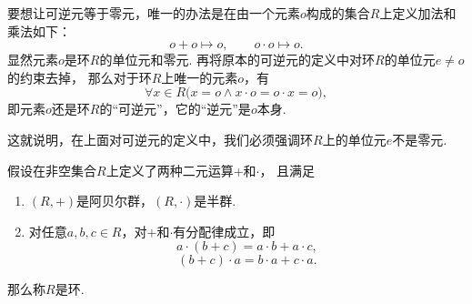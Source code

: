 \begin{example}
要想让可逆元等于零元，唯一的办法是在由一个元素\(o\)构成的集合\(R\)上定义加法和乘法如下：\[
    o + o \mapsto o,
    \qquad
    o \cdot o \mapsto o.
\]
显然元素\(o\)是环\(R\)的单位元和零元.
再将原本的可逆元的定义中对环\(R\)的单位元\(e \neq o\)的约束去掉，
那么对于环\(R\)上唯一的元素\(o\)，有\[
    \forall x \in R \bigl( x = o \land x \cdot o = o \cdot x = o \bigr),
\]
即元素\(o\)还是环\(R\)的“可逆元”，它的“逆元”是\(o\)本身.

这就说明，在上面对可逆元的定义中，我们必须强调环\(R\)上的单位元\(e\)不是零元.
\end{example}

\begin{theorem}
假设在非空集合\(R\)上定义了两种二元运算\(+\)和\(\cdot\)，
且满足\begin{enumerate}
    \item \((R,+)\)是阿贝尔群，\((R,\cdot)\)是半群.

    \item 对任意\(a,b,c \in R\)，对\(+\)和\(\cdot\)有分配律成立，即\[
        a \cdot (b + c) = a \cdot b + a \cdot c,
    \]\[
        (b + c) \cdot a = b \cdot a + c \cdot a.
    \]
\end{enumerate}
那么称\(R\)是环.
\end{theorem}
